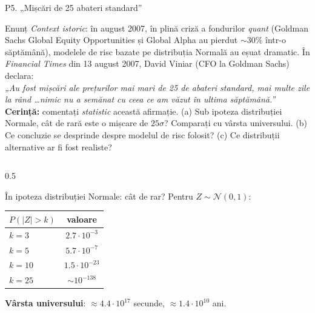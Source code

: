 \documentclass[9pt, aspectratio=169, t]{beamer}
\begin{document}
\begin{frame}[shrink=35]{P5. „Mișcări de 25 abateri standard''}
\begin{block}{Enunț}
\emph{Context istoric}: în august 2007, în plină criză a fondurilor \emph{quant} (Goldman Sachs Global Equity Opportunities și Global Alpha au pierdut $\sim 30\%$ într-o săptămână), modelele de risc bazate pe distribuția Normală au eșuat dramatic. În \emph{Financial Times} din 13 august 2007, David Viniar (CFO la Goldman Sachs) declara:\\[0.2em]
\emph{„Au fost mișcări ale prețurilor mai mari de 25 de abateri standard, mai multe zile la rând \dots nimic nu a semănat cu ceea ce am văzut în ultima săptămână.''}\\[0.2em]
\textbf{Cerință:} comentați \emph{statistic} această afirmație. (a) Sub ipoteza distribuției Normale, cât de rară este o mișcare de $25\sigma$? Comparați cu vârsta universului. (b) Ce concluzie se desprinde despre modelul de risc folosit? (c) Ce distribuții alternative ar fi fost realiste?
\end{block}
\begin{columns}[T]
\begin{column}{0.5\textwidth}
\begin{block}{În ipoteza distribuției Normale: cât de rar?}
Pentru $Z\sim\mathcal N(0,1)$:
\begin{center}\small
\begin{tabular}{lc}\toprule
$P(|Z|>k)$ & valoare\\\midrule
$k=3$ & $2.7\cdot 10^{-3}$\\
$k=5$ & $5.7\cdot 10^{-7}$\\
$k=10$ & $1.5\cdot 10^{-23}$\\
$k=25$ & $\sim 10^{-138}$\\\bottomrule
\end{tabular}
\end{center}
\textbf{Vârsta universului}: $\approx 4.4\cdot 10^{17}$ secunde, $\approx 1.4\cdot 10^{10}$ ani.


\end{block}
\end{column}
\end{columns}
\end{frame}
\end{document}
